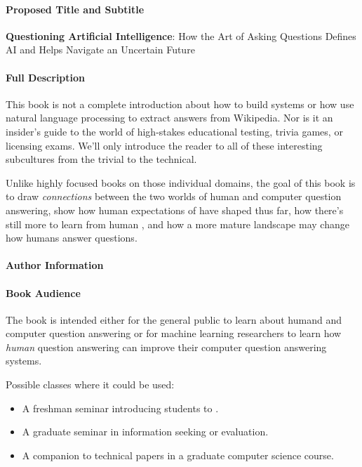 
\clearpage

\paragraph{Proposed Title and Subtitle} \vspace{3cm}

{\bf Questioning Artificial Intelligence}: How the Art of Asking Questions Defines AI and Helps Navigate an Uncertain Future

\vspace{3cm}


\paragraph{Full Description}



This book is not a complete introduction about how to build  systems
or how use natural language processing to extract answers from Wikipedia.
%
Nor is it an insider's guide to the world of high-stakes educational testing,
trivia games, or licensing exams.
%
We'll only introduce the reader to all of these interesting subcultures
from the trivial to the technical.

Unlike highly focused books on those individual domains, the goal of this book is to
draw \emph{connections} between the two worlds of human and computer
question answering, show how human expectations of  have
shaped  thus far, how there's still more to learn from
human , and how a more mature  landscape may change
how humans answer questions.


\paragraph{Author Information}



\paragraph{Book Audience}

The book is intended either for the general public to learn about humand and computer
question answering or for machine learning researchers to learn
how \emph{human} question answering can improve their computer question
answering systems.

Possible classes where it could be used:
\begin{itemize}
        \item A freshman seminar introducing students to .
        \item A graduate seminar in information seeking or evaluation.
        \item A companion to technical papers in a graduate computer science course.
\end{itemize}

